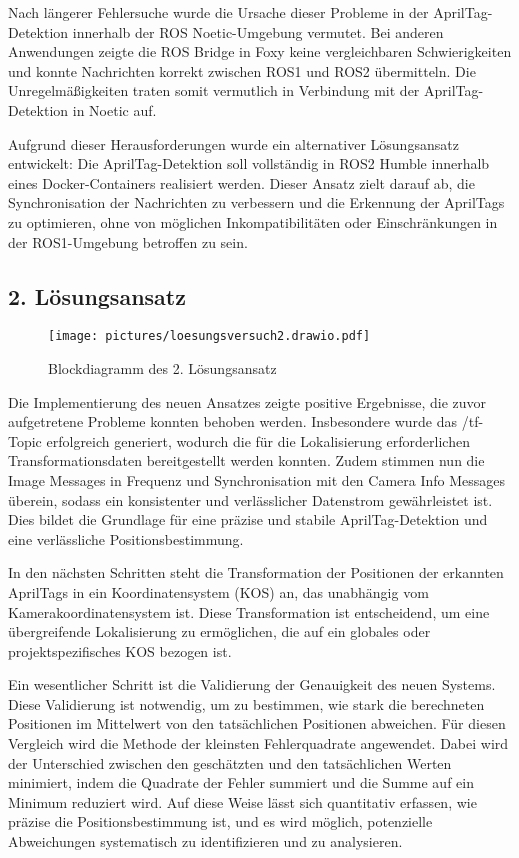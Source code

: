 \documentclass[ngerman]{article}    %
\theoremstyle{definition}
\begin{document}
Nach längerer Fehlersuche wurde die Ursache dieser Probleme in der AprilTag-Detektion innerhalb der ROS Noetic-Umgebung vermutet. Bei anderen Anwendungen zeigte die ROS Bridge in Foxy keine vergleichbaren Schwierigkeiten und konnte Nachrichten korrekt zwischen ROS1 und ROS2 übermitteln. Die Unregelmäßigkeiten traten somit vermutlich in Verbindung mit der AprilTag-Detektion in Noetic auf.

Aufgrund dieser Herausforderungen wurde ein alternativer Lösungsansatz entwickelt: Die AprilTag-Detektion soll vollständig in ROS2 Humble innerhalb eines Docker-Containers realisiert werden. Dieser Ansatz zielt darauf ab, die Synchronisation der Nachrichten zu verbessern und die Erkennung der AprilTags zu optimieren, ohne von möglichen Inkompatibilitäten oder Einschränkungen in der ROS1-Umgebung betroffen zu sein.

\newpage

\subsection{2. Lösungsansatz}


\begin{figure}[htb]
    \centering
    \texttt{[image: pictures/loesungsversuch2.drawio.pdf]}
    \caption{Blockdiagramm des 2. Lösungsansatz}
    \label{fig:ansatz2}
\end{figure}


Die Implementierung des neuen Ansatzes zeigte positive Ergebnisse, die zuvor aufgetretene Probleme konnten behoben werden. Insbesondere wurde das /tf-Topic erfolgreich generiert, wodurch die für die Lokalisierung erforderlichen Transformationsdaten bereitgestellt werden konnten. Zudem stimmen nun die Image Messages in Frequenz und Synchronisation mit den Camera Info Messages überein, sodass ein konsistenter und verlässlicher Datenstrom gewährleistet ist. Dies bildet die Grundlage für eine präzise und stabile AprilTag-Detektion und eine verlässliche Positionsbestimmung.

In den nächsten Schritten steht die Transformation der Positionen der erkannten AprilTags in ein Koordinatensystem (KOS) an, das unabhängig vom Kamerakoordinatensystem ist. Diese Transformation ist entscheidend, um eine übergreifende Lokalisierung zu ermöglichen, die auf ein globales oder projektspezifisches KOS bezogen ist.

Ein wesentlicher Schritt ist die Validierung der Genauigkeit des neuen Systems. Diese Validierung ist notwendig, um zu bestimmen, wie stark die berechneten Positionen im Mittelwert von den tatsächlichen Positionen abweichen. Für diesen Vergleich wird die Methode der kleinsten Fehlerquadrate angewendet. Dabei wird der Unterschied zwischen den geschätzten und den tatsächlichen Werten minimiert, indem die Quadrate der Fehler summiert und die Summe auf ein Minimum reduziert wird. Auf diese Weise lässt sich quantitativ erfassen, wie präzise die Positionsbestimmung ist, und es wird möglich, potenzielle Abweichungen systematisch zu identifizieren und zu analysieren.
\end{document}
